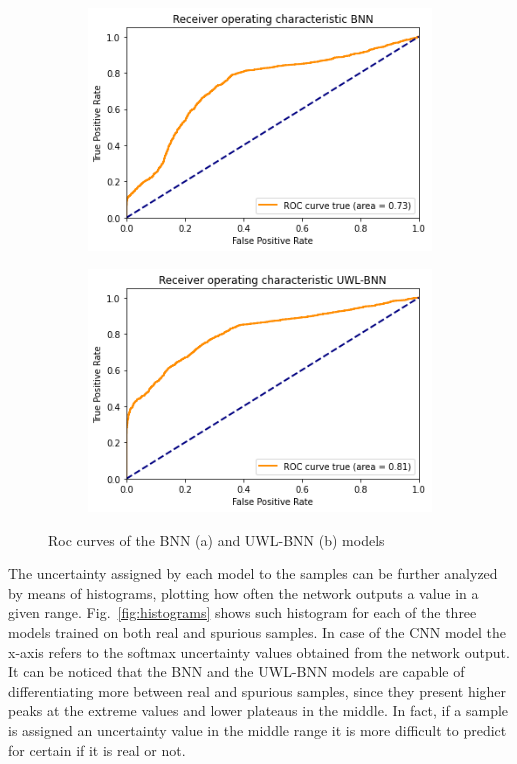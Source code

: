 \documentclass[11pt,twoside,a4paper]{article}
\begin{document}
\begin{figure}[!t]
    \centering
    \begin{subfigure}{0.49\textwidth}
	\includegraphics[width=\linewidth]{images/roc_bnn.png}
        \caption{}
    \end{subfigure}
    \begin{subfigure}{0.49\textwidth}
	\includegraphics[width=\linewidth]{images/roc_custom.png}
        \caption{}
    \end{subfigure}
    \caption{Roc curves of the BNN (a) and UWL-BNN (b) models}
    \label{fig:roc}
\end{figure}

The uncertainty assigned by each model to the samples can be further analyzed by means of histograms, plotting how often the network outputs a value in a given range. Fig.~\ref{fig:histograms} shows such histogram for each of the three models trained on both real and spurious samples. In case of the CNN model the x-axis refers to the softmax uncertainty values obtained from the network output. It can be noticed that the BNN and the UWL-BNN models are capable of differentiating more between real and spurious samples, since they present higher peaks at the extreme values and lower plateaus in the middle. In fact, if a sample is assigned an uncertainty value in the middle range it is more difficult to predict for certain if it is real or not.
\end{document}
